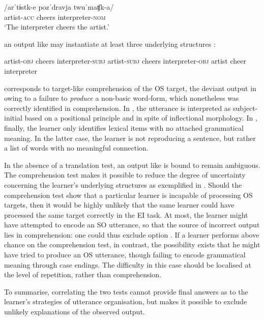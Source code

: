 \ea%
    \label{ex:06:2}
    \gll    /arˈtɨstk-e  pozˈdravja  twuˈmaʧk-a/\\
            artist-\textsc{acc}  cheers    interpreter-\textsc{nom}\\
    \glt    `The interpreter cheers the artist.'
    \z

an output like  may instantiate at least three underlying structures :

\ea%
    \label{ex:06:3}
    \ea\label{ex:06:3a}
    artist-\textsc{obj}  cheers    interpreter-\textsc{subj}
    \ex\label{ex:06:3b}
    artist-\textsc{subj}  cheers    interpreter-\textsc{obj}
    \ex\label{ex:06:3c}
    artist     cheer    interpreter
    \z
\z

 corresponds to target-like comprehension of the OS target, the deviant output in  owing to a failure to \textit{produce} a non-basic word-form, which nonetheless was correctly identified in comprehension. In , the utterance is interpreted as subject-	initial based on a positional principle and in spite of inflectional morphology. In , finally, the learner only identifies lexical items with no attached grammatical meaning. In the latter case, the learner is not reproducing a sentence, but rather a list of words with no meaningful connection.

In the absence of a translation test, an output like  is bound to remain ambiguous. The comprehension test makes it possible to reduce the degree of uncertainty concerning the learner’s underlying structures as exemplified in . Should the comprehension test show that a particular learner is incapable of processing OS targets, then it would be highly unlikely that the same learner could have processed the same target correctly in the EI task. At most, the learner might have attempted to encode an SO utterance, so that the source of incorrect output lies in comprehension: one could thus exclude option . If a learner performs above chance on the comprehension test, in contrast, the possibility exists that he might have tried to produce an OS utterance, though failing to encode grammatical meaning through case endings. The difficulty in this case should be localised at the level of repetition, rather than comprehension.

To summarise, correlating the two tests cannot provide final answers as to the learner's strategies of utterance organisation, but makes it possible to exclude unlikely explanations of the observed output.

